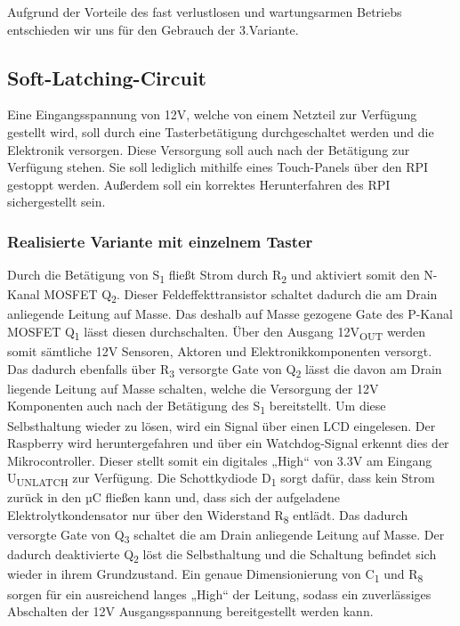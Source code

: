 Aufgrund der Vorteile des fast verlustlosen und wartungsarmen Betriebs entschieden wir uns für den Gebrauch der 3.Variante.

\newpage

\subsection{Soft-Latching-Circuit}

Eine Eingangsspannung von 12V, welche von einem Netzteil zur Verfügung gestellt wird, soll durch eine Tasterbetätigung durchgeschaltet werden und die Elektronik versorgen.
Diese Versorgung soll auch nach der Betätigung zur Verfügung stehen.
Sie soll lediglich mithilfe eines Touch-Panels über den \acs{RPI} gestoppt werden.
Außerdem soll ein korrektes Herunterfahren des RPI sichergestellt sein.

\subsubsection{Realisierte Variante mit einzelnem Taster}

Durch die Betätigung von S\textsubscript{1} fließt Strom durch R\textsubscript{2} und aktiviert somit den N-Kanal MOSFET Q\textsubscript{2}.
Dieser Feldeffekttransistor schaltet dadurch die am Drain anliegende Leitung auf Masse.
Das deshalb auf Masse gezogene Gate des P-Kanal MOSFET Q\textsubscript{1} lässt diesen durchschalten.
Über den Ausgang 12V\textsubscript{OUT} werden somit sämtliche 12V Sensoren, Aktoren und Elektronikkomponenten versorgt.
Das dadurch ebenfalls über R\textsubscript{3} versorgte Gate von Q\textsubscript{2} lässt die davon am Drain liegende Leitung auf Masse schalten,
welche die Versorgung der 12V Komponenten auch nach der Betätigung des S\textsubscript{1} bereitstellt.
Um diese Selbsthaltung wieder zu lösen, wird ein Signal über einen LCD eingelesen.
Der Raspberry wird heruntergefahren und über ein Watchdog-Signal erkennt dies der Mikrocontroller.
Dieser stellt somit ein digitales „High“ von 3.3V am Eingang U\textsubscript{UNLATCH} zur Verfügung.
Die Schottkydiode D\textsubscript{1} sorgt dafür, dass kein Strom zurück in den µC fließen kann und,
dass sich der aufgeladene Elektrolytkondensator nur über den Widerstand R\textsubscript{8} entlädt.
Das dadurch versorgte Gate von Q\textsubscript{3} schaltet die am Drain anliegende Leitung auf Masse.
Der dadurch deaktivierte Q\textsubscript{2} löst die Selbsthaltung und die Schaltung befindet sich wieder in ihrem Grundzustand.
Ein genaue Dimensionierung von C\textsubscript{1} und R\textsubscript{8} sorgen für ein ausreichend langes „High“ der Leitung,
sodass ein zuverlässiges Abschalten der 12V Ausgangsspannung bereitgestellt werden kann. \\

